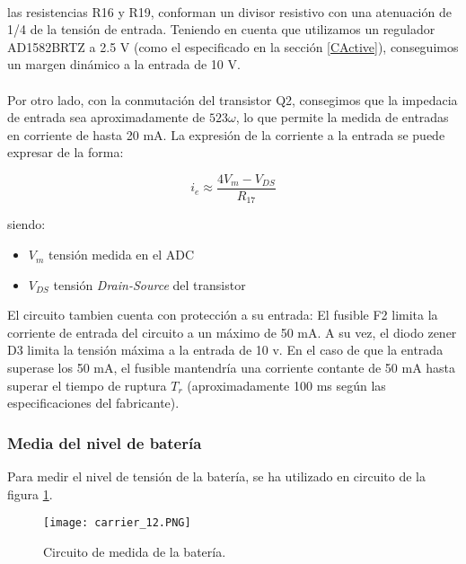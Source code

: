 \paragraph{}
las resistencias R16 y R19, conforman un divisor resistivo con una atenuación de 1/4 de la tensión de entrada. Teniendo en cuenta que utilizamos un regulador AD1582BRTZ a 2.5 V (como el especificado en la sección \ref{CActive}), conseguimos un margen dinámico a la entrada de 10 V.
\paragraph{}
Por otro lado, con la conmutación del transistor Q2, consegimos que la impedacia de entrada sea aproximadamente de $ 523 \omega $, lo que permite la medida de entradas en corriente de hasta 20 mA. La expresión de la  corriente a la entrada se puede expresar de la forma:

\pagebreak

\begin{equation}
	i_e \approx \frac{4V_m - V_{DS} }{R_{17}}
\end{equation}

siendo:
\begin{itemize}
	\item $V_m$ tensión medida en el ADC
	\item $V_{DS}$ tensión \textit{Drain-Source} del transistor
\end{itemize}


El circuito tambien cuenta con protección a su entrada: El fusible F2 limita la corriente de entrada del circuito a un máximo de 50 mA. A su vez, el diodo zener D3 limita la tensión máxima a la entrada de 10 v. En el caso de que la entrada superase los 50 mA, el fusible mantendría una corriente contante de 50 mA hasta superar el tiempo de ruptura $T_r$ (aproximadamente 100 ms según las especificaciones del fabricante).
		
		\subsubsection{Media del nivel de batería}

Para medir el nivel de tensión de la batería, se ha utilizado en circuito de la figura \ref{fig:car12}.

\begin{figure}[hbt!]
	\centering
	\texttt{[image: carrier\_12.PNG]}
	\caption{Circuito de medida de la batería.}
	\label{fig:car12}
\end{figure}			
		
